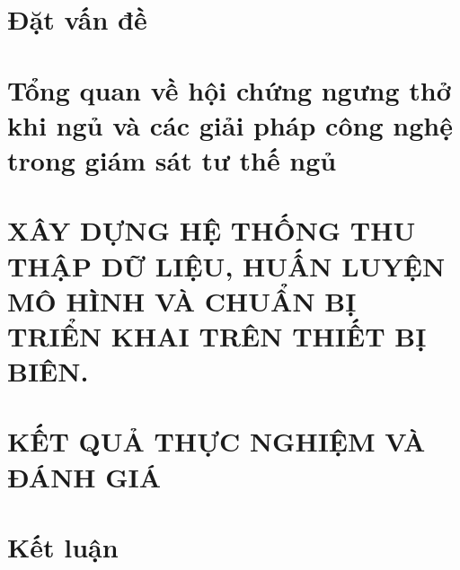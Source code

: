 \documentclass[12pt,a4paper,oneside]{book} %
\renewcommand\thechapter{\arabic{chapter}}
\begin{document}
\renewcommand{\thelstlisting}{\thechapter.\arabic{lstlisting}}

\renewcommand{\thedefinition}{\thechapter.\arabic{definition}}




\pagestyle{plain}
\frontmatter


\tableofcontents


\renewcommand{\listfigurename}{Danh sách hình vẽ}
\renewcommand{\listtablename}{Danh sách bảng}

\listoffigures
{}

\listoftables
{}


\mainmatter


\changefontsizes[16pt]{13pt}
\chapter*{Đặt vấn đề}
\thispagestyle{empty}


\chapter{Tổng quan về hội chứng ngưng thở khi ngủ và các giải pháp công nghệ trong giám sát tư thế ngủ}
\label{chapter:1-introduction}




\chapter{XÂY DỰNG HỆ THỐNG THU THẬP DỮ LIỆU, HUẤN LUYỆN MÔ HÌNH VÀ 
CHUẨN BỊ TRIỂN KHAI TRÊN THIẾT BỊ BIÊN.\label{the_proposed_method_section}}


\chapter{KẾT QUẢ THỰC NGHIỆM VÀ ĐÁNH GIÁ}


% 
\chapter{Kết luận}



% 



% 



\newpage
\printbibliography
\end{document}
